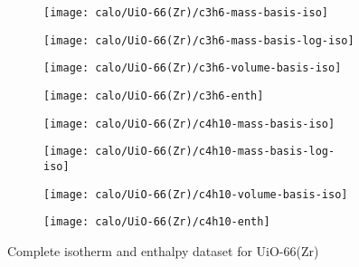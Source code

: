 \begin{figure}[H]
    \begin{subfigure}{0.25\textwidth}
        \texttt{[image: calo/UiO-66(Zr)/c3h6-mass-basis-iso]}%
        \label{appx:fig:shaping:uio66c3h6mass}
    \end{subfigure}%
    \begin{subfigure}{0.25\textwidth}
        \texttt{[image: calo/UiO-66(Zr)/c3h6-mass-basis-log-iso]}%
        \label{appx:fig:shaping:uio66c3h6masslog}
    \end{subfigure}%
    \begin{subfigure}{0.25\textwidth}
        \texttt{[image: calo/UiO-66(Zr)/c3h6-volume-basis-iso]}%
        \label{appx:fig:shaping:uio66c3h6volume}
    \end{subfigure}%
    \begin{subfigure}{0.25\textwidth}
        \texttt{[image: calo/UiO-66(Zr)/c3h6-enth]}%
        \label{appx:fig:shaping:uio66c3h6enth}%
    \end{subfigure}%

    \begin{subfigure}{0.25\textwidth}
        \texttt{[image: calo/UiO-66(Zr)/c4h10-mass-basis-iso]}%
        \label{appx:fig:shaping:uio66c4h10mass}
    \end{subfigure}%
    \begin{subfigure}{0.25\textwidth}
        \texttt{[image: calo/UiO-66(Zr)/c4h10-mass-basis-log-iso]}%
        \label{appx:fig:shaping:uio66c4h10masslog}
    \end{subfigure}%
    \begin{subfigure}{0.25\textwidth}
        \texttt{[image: calo/UiO-66(Zr)/c4h10-volume-basis-iso]}%
        \label{appx:fig:shaping:uio66c4h10volume}
    \end{subfigure}%
    \begin{subfigure}{0.25\textwidth}
        \texttt{[image: calo/UiO-66(Zr)/c4h10-enth]}%
        \label{appx:fig:shaping:uio66c4h10enth}%
    \end{subfigure}%

    \caption{Complete isotherm and enthalpy dataset for UiO-66(Zr)}%
    \label{appx:fig:shaping:calouio66}
\end{figure}
